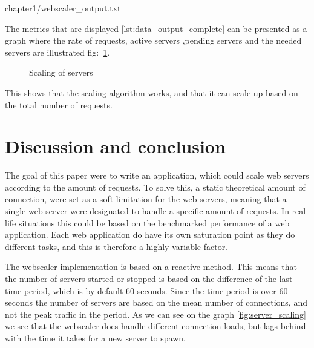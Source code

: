 \begin{center}

{chapter1/webscaler_output.txt}
\end{center}

The metrics that are displayed \ref{lst:data_output_complete} can be presented 
as a graph where the rate of requests, active servers ,pending servers and the 
needed servers are illustrated fig:~\ref{fig:server_scaling}.

\begin{figure}[H]
\centering
{}
\caption{\label{fig:server_scaling}Scaling of servers}
\end{figure}

This shows that the scaling algorithm works, and that it can scale up based on
the total number of requests.

\section{Discussion and conclusion}

The goal of this paper were to write an application, which could scale
web servers according to the amount of requests. To solve this, a static
theoretical amount of connection, were set as a soft limitation for the web
servers, meaning that a single web server were designated to handle a specific
amount of requests. In real life situations this could be based on the
benchmarked performance of a web application. Each web application do have its
own saturation point as they do different tasks, and this is therefore a highly
variable factor.

The webscaler implementation is based on a reactive method. This means that the
number of servers started or stopped is based on the difference of the last
time period, which is by default 60 seconds. Since the time period is over 60
seconds the number of servers are based on the mean number of connections, and
not the peak traffic in the period. As we can see on the graph
\vref{fig:server_scaling} we see that the webscaler does handle different
connection loads, but lags behind with the time it takes for a new server to
spawn.

